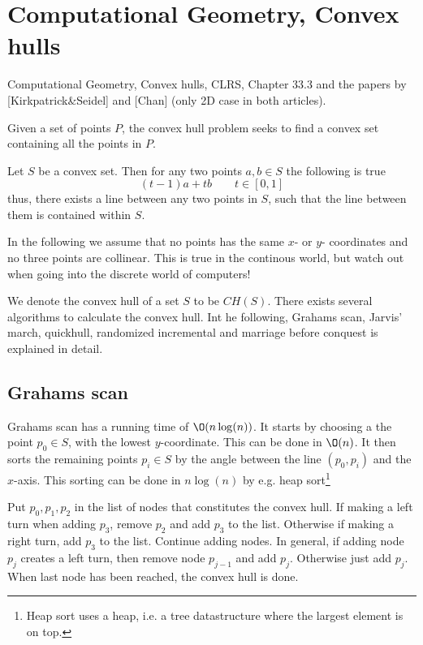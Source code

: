 \documentclass[10pt]{article}
\begin{document}


\clearpage \newpage
\section{Computational Geometry, Convex hulls} %
\label{sec:computational_geometry_convex_hulls}
Computational Geometry, Convex  hulls, CLRS,  Chapter 33.3 and the papers by [Kirkpatrick\&Seidel] and [Chan] (only 2D case in both articles).

Given a set of points $P$, the convex hull problem seeks to find a convex set containing all the points in $P$.

Let $S$ be a convex set. Then for any two points $a,b \in S$ the following is true
\begin{equation}
  (t-1)a+tb \qquad t \in [0,1]
\end{equation}
thus, there exists a line between any two points in $S$, such that the line between them is contained within $S$.

In the following we assume that no points has the same $x$- or $y$- coordinates and no three points are collinear. This is true in the continous world, but watch out when going into the discrete world of computers!

We denote the convex hull of a set $S$ to be $CH(S)$. There exists several algorithms to calculate the convex hull. Int he following, Grahams scan, Jarvis' march, quickhull, randomized incremental and marriage before conquest is explained in detail.

\subsection{Grahams scan} %
\label{sub:grahams_scan}
Grahams scan has a running time of $\O(n\log(n))$. It starts by choosing a the point $p_0 \in S$, with the lowest $y$-coordinate. This can be done in $\O(n)$. It then sorts the remaining points $p_i \in S$ by the angle between the line $(p_0, p_i)$ and the $x$-axis. This sorting can be done in $n \log(n)$ by e.g. heap sort\footnote{Heap sort uses a heap, i.e. a tree datastructure where the largest element is on top.} 

Put $p_0, p_1, p_2$ in the list of nodes that constitutes the convex hull. If making a left turn when adding $p_3$, remove $p_2$ and add $p_3$ to the list. Otherwise if making a right turn, add $p_3$ to the list. Continue adding nodes. In general, if adding node $p_j$ creates a left turn, then remove node $p_{j-1}$ and add $p_j$. Otherwise just add $p_j$. When last node has been reached, the convex hull is done.
\end{document}
